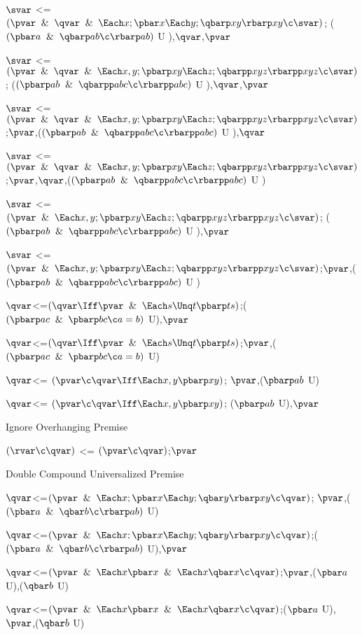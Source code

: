 $\svar$ <=  $(\pvar \And \qvar\And \Each x;\pbar x \Each y;\qbarp xy \rbarp xy \c \svar)$; ($(\pbar a \And \qbarp ab \c \rbarp ab)$ U ),$\qvar$,$\pvar$

$\svar$ <=  $(\pvar \And \qvar\And \Each x,y ;\pbarp xy \Each z;\qbarpp xyz \rbarpp xyz \c \svar)$; ($(\pbarp ab \And \qbarpp abc \c \rbarpp abc)$ U ),$\qvar$,$\pvar$

$\svar$ <=  $(\pvar \And \qvar\And \Each x,y ;\pbarp xy \Each z;\qbarpp xyz \rbarpp xyz \c \svar)$;$\pvar$,($(\pbarp ab \And \qbarpp abc \c \rbarpp abc)$ U ),$\qvar$

$\svar$ <=  $(\pvar \And \qvar\And \Each x,y ;\pbarp xy \Each z;\qbarpp xyz \rbarpp xyz \c \svar)$;$\pvar$,$\qvar$,($(\pbarp ab \And \qbarpp abc \c \rbarpp abc)$ U )

$\svar$ <=  $(\pvar \And \Each x,y ;\pbarp xy \Each z;\qbarpp xyz \rbarpp xyz \c \svar)$; ($(\pbarp ab \And \qbarpp abc \c \rbarpp abc)$ U ),$\pvar$

$\svar$ <=  $(\pvar \And \Each x,y ;\pbarp xy \Each z;\qbarpp xyz \rbarpp xyz \c \svar)$;$\pvar$,($(\pbarp ab \And \qbarpp abc \c \rbarpp abc)$ U )

$\qvar$<=$(\qvar \Iff \pvar \And \Each s\Unq t \pbarp ts)$;($(\pbarp ac \And \pbarp bc \c a = b)$ U),$\pvar$

$\qvar$<=$(\qvar \Iff \pvar \And \Each s\Unq t \pbarp ts)$;$\pvar$,($(\pbarp ac \And \pbarp bc \c a = b)$ U)

$\qvar $<= $(\pvar \c \qvar \Iff \Each x,y \pbarp xy)$; $\pvar$,($\pbarp ab$ U)

$\qvar $<= $(\pvar \c \qvar \Iff \Each x,y \pbarp xy)$; ($\pbarp ab$ U),$\pvar$

\lineb

Ignore Overhanging Premise

$(\rvar \c \qvar)$ <=  $(\pvar \c \qvar)$;$\pvar$
\lineb

Double Compound Universalized Premise
\lineb

$\qvar$<=$(\pvar \And \Each x ;\pbar x \Each y ;\qbar y \rbarp xy\c \qvar)$; $\pvar$,($(\pbar a \And \qbar b \c \rbarp ab)$ U)

$\qvar$<=$(\pvar \And \Each x ;\pbar x \Each y ;\qbar y \rbarp xy\c \qvar)$;($(\pbar a \And \qbar b \c \rbarp ab)$ U),$\pvar$

$\qvar$<=$(\pvar \And \Each x \pbar x \And \Each x \qbar x \c \qvar)$;$\pvar$,($\pbar a$ U),($\qbar b$ U)

$\qvar$<=$(\pvar \And \Each x \pbar x \And \Each x \qbar x \c \qvar)$;($\pbar a$ U),$\pvar$,($\qbar b$ U)

